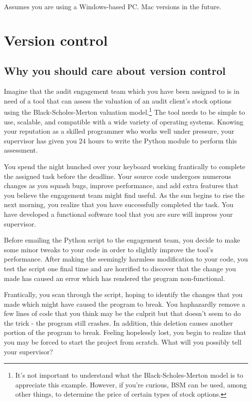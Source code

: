\documentclass{book}
\begin{document}
Assumes you are using a Windows-based PC. Mac versions in the future.


\chapter{Version control}
\section{Why you should care about version control}

Imagine that the audit engagement team which you have been assigned to is in need of a tool that can assess the valuation of an audit client's stock options using the Black-Scholes-Merton valuation model.\footnote{It's not important to understand what the Black-Scholes-Merton model is to appreciate this example. However, if you're curious, BSM can be used, among other things, to determine the price of certain types of stock options.} The tool needs to be simple to use, scalable, and compatible with a wide variety of operating systems. Knowing your reputation as a skilled programmer who works well under pressure, your supervisor has given you 24 hours to write the Python module to perform this assessment.

You spend the night hunched over your keyboard working frantically to complete the assigned task before the deadline. Your source code undergoes numerous changes as you squash bugs, improve performance, and add extra features that you believe the engagement team might find useful. As the sun begins to rise the next morning, you realize that you have successfully completed the task. You have developed a functional software tool that you are sure will impress your supervisor. 

Before emailing the Python script to the engagement team, you decide to make some minor tweaks to your code in order to slightly improve the tool's performance. After making the seemingly harmless modification to your code, you test the script one final time and are horrified to discover that the change you made has caused an error which has rendered the program non-functional.

Frantically, you scan through the script, hoping to identify the changes that you made which might have caused the program to break. You haphazardly remove a few lines of code that you think may be the culprit but that doesn't seem to do the trick - the program still crashes. In addition, this deletion causes another portion of the program to break. Feeling hopelessly lost, you begin to realize that you may be forced to start the project from scratch. What will you possibly tell your supervisor?
\end{document}

